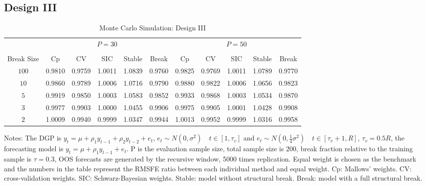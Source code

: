 \subsection{Design III}
\begin{table}
    \caption{Monte Carlo Simulation: Design III} \label{ntb:4}
    \centering
    \begin{adjustbox}{width=\textwidth,totalheight=\textheight,keepaspectratio}
    \begin{threeparttable}
    \begin{tabular}{ccccccccccc}
    \toprule
     & \multicolumn{5}{c}{$P = 30$} & \multicolumn{5}{c}{$P = 50$} \\
    \cmidrule(r){2-6}
    \cmidrule(r){7-11} \\
    Break Size      & Cp     & CV     & SIC    & Stable & Break  & Cp     & CV     & SIC    & Stable & Break  \\
    $100$           & 0.9810 &0.9759  &1.0011  & 1.0839 &0.9760  & 0.9825 &0.9769  &1.0011  & 1.0789 &0.9770 \\
    $10$            & 0.9860 &0.9789  &1.0006  & 1.0716 &0.9790  & 0.9880 &0.9822  &1.0006  & 1.0656 &0.9823 \\
    $5$             & 0.9919 &0.9850  &1.0003  & 1.0583 &0.9852  & 0.9933 &0.9868  &1.0003  & 1.0534 &0.9870 \\
    $3$             & 0.9977 &0.9903  &1.0000  & 1.0455 &0.9906  & 0.9975 &0.9905  &1.0001  & 1.0428 &0.9908 \\
    $2$             & 1.0009 &0.9940  &0.9999  & 1.0347 &0.9944  & 1.0013 &0.9952  &0.9999  & 1.0316 &0.9958 \\
    \bottomrule
    \end{tabular}
    \begin{tablenotes} \footnotesize
    Notes: The DGP is $y_{t} = \mu + \rho_{1}y_{t-1} + \rho_{2}y_{t-2} + e_{t}$, $e_{t} \sim N(0,\sigma^2) \quad t \in [1,\tau_{v}]$ and $e_{t} \sim N(0,\frac{1}{4}\sigma^2) \quad t \in [\tau_{v}+1, R]$, $\tau_{v} = 0.5R$, the forecasting model is $y_{t} = \mu + \rho_{1}y_{t-1} + e_{t}$. $\mathrm{P}$ is the evaluation sample size, total sample size is $200$, break fraction relative to the training sample is $\tau = 0.3$, OOS forecasts are generated by the recursive window, 5000 times replication. Equal weight is chosen as the benchmark and the numbers in the table represent the RMSFE ratio between each individual method and equal weight. Cp: Mallows' weights. CV: cross-validation weights. SIC: Schwarz-Bayesian weights. Stable: model without structural break. Break: model with a full structural break.
    \end{tablenotes}
    \end{threeparttable}
    \end{adjustbox}
\end{table}
